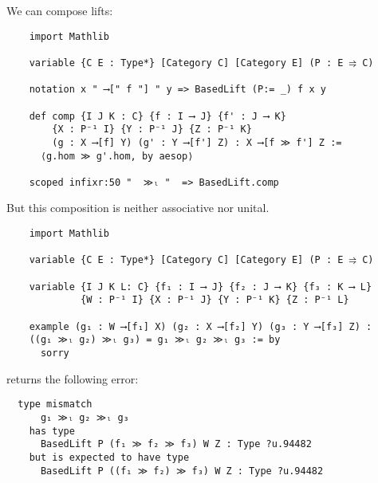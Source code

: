 \documentclass[landscape]{slides}
\begin{document}
\begin{slide}
  \par{}\baselineskip

  We can compose lifts: 

  \par{}\baselineskip

  \begin{lstlisting}
    import Mathlib

    variable {C E : Type*} [Category C] [Category E] (P : E ⥤ C)

    notation x " ⟶[" f "] " y => BasedLift (P:= _) f x y

    def comp {I J K : C} {f : I ⟶ J} {f' : J ⟶ K} 
        {X : P⁻¹ I} {Y : P⁻¹ J} {Z : P⁻¹ K} 
        (g : X ⟶[f] Y) (g' : Y ⟶[f'] Z) : X ⟶[f ≫ f'] Z :=
      ⟨g.hom ≫ g'.hom, by aesop⟩

    scoped infixr:50 "  ≫ₗ "  => BasedLift.comp  

  \end{lstlisting}

\end{slide}


\begin{slide}
  \par{}\baselineskip

  But this composition is neither associative nor unital.
   
  \par{}\baselineskip

  \begin{lstlisting}
    import Mathlib

    variable {C E : Type*} [Category C] [Category E] (P : E ⥤ C)

    variable {I J K L: C} {f₁ : I ⟶ J} {f₂ : J ⟶ K} {f₃ : K ⟶ L} 
             {W : P⁻¹ I} {X : P⁻¹ J} {Y : P⁻¹ K} {Z : P⁻¹ L} 

    example (g₁ : W ⟶[f₁] X) (g₂ : X ⟶[f₂] Y) (g₃ : Y ⟶[f₃] Z) :  
    ((g₁ ≫ₗ g₂) ≫ₗ g₃) = g₁ ≫ₗ g₂ ≫ₗ g₃ := by
      sorry 
  \end{lstlisting}

  returns the following error:

  \begin{lstlisting}
  type mismatch
      g₁ ≫ₗ g₂ ≫ₗ g₃
    has type
      BasedLift P (f₁ ≫ f₂ ≫ f₃) W Z : Type ?u.94482
    but is expected to have type
      BasedLift P ((f₁ ≫ f₂) ≫ f₃) W Z : Type ?u.94482
  \end{lstlisting}  

\end{slide}
\end{document}
